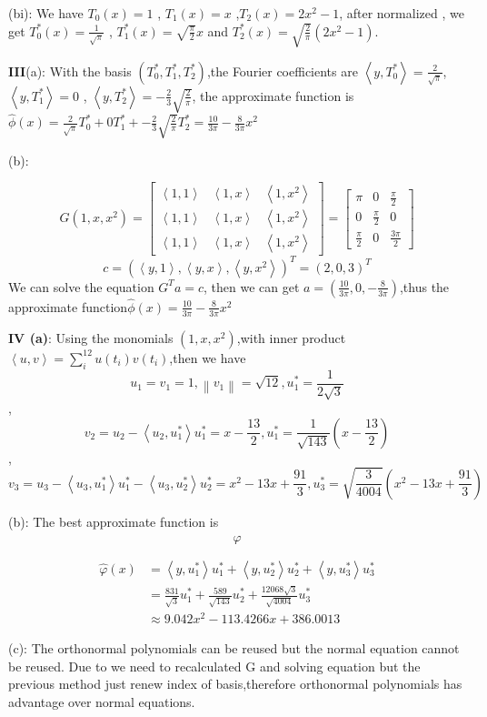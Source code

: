 \documentclass{article}
\newcommand{\avg}[1]{\left\langle #1 \right\rangle}
\newcommand{\norm}[1]{\left\| #1 \right\|}
\begin{document}
 (bi):
 We have $T_0(x)=1 $ , $ T_1(x)=x $ ,$T_2(x) = 2x^2-1$, after normalized , we get $T_0^*(x) = \frac{1}{\sqrt{\pi}}$ , $T_1^*(x) = \sqrt{\frac{\pi}{2}}x$ and $T_2^*(x)=\sqrt{\frac{2}{\pi}}(2x^2-1)$.

 \textbf{III}(a): With the basis $(T_0^*,T_1^*,T_2^*)$,the Fourier coefficients are $\avg{y,T_0^*} = \frac{2}{\sqrt{\pi}}$, $\avg{y,T_1^*} = 0$ , $\avg{y,T_2^*} = -\frac{2}{3}\sqrt{\frac{2}{\pi}}$, the approximate function is $\hat{\phi}(x) = \frac{2}{\sqrt{\pi}}T_0^* + 0T_1^* + -\frac{2}{3}\sqrt{\frac{2}{\pi}}T_2^* = \frac{10}{3\pi} -\frac{8}{3\pi}x^2$ 
 
 (b):

\[
  G(1,x,x^2) =
  \left[ {\begin{array}{ccc}
    \avg{1,1}& \avg{1,x} & \avg{1,x^2}\\
    \avg{1,1}& \avg{1,x} & \avg{1,x^2}\\
    \avg{1,1}& \avg{1,x} & \avg{1,x^2}
  \end{array} } \right]
  =\left[ {\begin{array}{ccc}
    \pi& 0 & \frac{\pi}{2}\\
    0 & \frac{\pi}{2} & 0\\
    \frac{\pi}{2}& 0 & \frac{3\pi}{2}
  \end{array} } \right]
\]
\[ c = (\avg{y,1} , \avg{y,x} , \avg{y,x^2} )^T = (2,0,3)^T\]
We can solve the equation $G^Ta=c$, then we can get $a = (\frac{10}{3\pi} , 0 , -\frac{8}{3\pi})$,thus the approximate function$\hat{\phi}(x) = \frac{10}{3\pi} -\frac{8}{3\pi}x^2$ 

\textbf{IV (a)}: Using the monomials $(1,x,x^2)$,with inner product$\avg{u,v} = \sum_i^{12}u(t_i)v(t_i)$,then we have 
\[ u_1=v_1=1, \norm{v_1}=\sqrt{12} , u_1^* = \frac{1}{2\sqrt{3}}\] ,
\[v_2 = u_2 -\avg{u_2,u_1^*}u_1^* = x - \frac{13}{2}, u_1^* = \frac{1}{\sqrt{143}}(x-\frac{13}{2})\],
\[v_3 = u_3 - \avg{u_3,u_1^*}u_1^* - \avg{u_3,u_2^*}u_2^* = x^2 -13x + \frac{91}{3}, u_3^* = \sqrt{\frac{3}{4004}}(x^2-13x+\frac{91}{3})\]

 (b): The best approximate function is 
 \[
    \hat{\varphi}
 \]

 \begin{equation*}
      \begin{aligned}
            \hat{\varphi}(x) &= \avg{y,u_1^*}u_1^* +\avg{y,u_2^*}u_2^* + \avg{y,u_3^*}u_3^* \\
                  &= \frac{831}{\sqrt{3}}u_1^* + \frac{589}{\sqrt{143}}u_2^* 
                  + \frac{12068\sqrt{3}}{\sqrt{4004}}u_3^* \\
                  &\approx 9.042x^2 - 113.4266x+386.0013
      \end{aligned}
\end{equation*}

(c): The orthonormal polynomials can be reused but the normal equation cannot be reused. Due to we need to recalculated G and solving equation but the previous method just renew index of basis,therefore orthonormal polynomials has advantage over normal equations.
\end{document}
